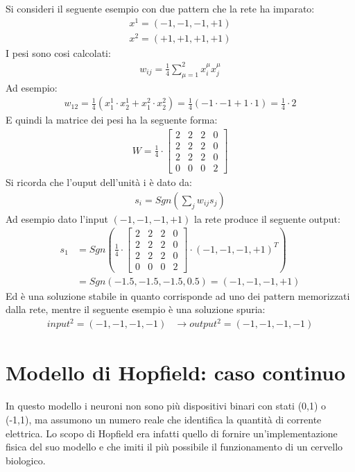 Si consideri il seguente esempio con due pattern che la rete ha imparato:
\begin{align*}
	x^1 = (-1,-1,-1,+1) \\
	x^2 = (+1,+1,+1,+1)
\end{align*}
I pesi sono cosi calcolati:
\begin{align*}
	w_{ij} = \frac{1}{4} \sum_{\mu=1}^2 x_i^\mu x_j^\mu
	\end{align*} 
	Ad esempio:
	\begin{align*}
		w_{12} = \frac{1}{4}(x^1_1 \cdot x^1_2 + x^2_1 \cdot x^2_2) = 
		\frac{1}{4}(-1 \cdot -1 + 1 \cdot 1) = \frac{1}{4} \cdot 2
	\end{align*}
	E quindi la matrice dei pesi ha la seguente forma:
	\begin{align*}
		W = \frac{1}{4} \cdot
		\begin{bmatrix}
			2 & 2 & 2 & 0 \\
			2 & 2 & 2 & 0 \\
			2 & 2 & 2 & 0 \\
			0 & 0 & 0 & 2
		\end{bmatrix}
	\end{align*}
	Si ricorda che l'ouput dell'unità i è dato da:
	\begin{align*}
		s_i = Sgn \left(\sum_j w_{ij} s_j \right)
	\end{align*}
	Ad esempio dato l'input $(-1,-1,-1,+1)$ la rete produce il seguente output:
	\begin{align*}
		s_1 &= Sgn \left( \frac{1}{4} \cdot
		\begin{bmatrix}
			2 & 2 & 2 & 0 \\
			2 & 2 & 2 & 0 \\
			2 & 2 & 2 & 0 \\
			0 & 0 & 0 & 2
			\end{bmatrix} \cdot (-1, -1, -1, +1)^T \right) \\ 
			&= Sgn(-1.5, -1.5, -1.5, 0.5) = (-1,-1,-1,+1)
		\end{align*}
		Ed è una soluzione stabile in quanto corrisponde ad uno dei pattern memorizzati dalla rete, mentre il seguente esempio è una soluzione spuria:
		\begin{align*}
			input^2 = (-1,-1,-1,-1)&\longrightarrow output^2 = (-1,-1,-1,-1) \tag{spuria}
		\end{align*}


		\newpage


		\section{Modello di Hopfield: caso continuo} %
		\label{sec:modello_di_hopfield_caso_continuo}
		In questo modello i neuroni non sono più dispositivi binari con stati (0,1) o (-1,1), ma assumono un numero reale che identifica la quantità di corrente elettrica. Lo scopo di Hopfield era infatti quello di fornire un'implementazione fisica del suo modello e che imiti il più possibile il funzionamento di un cervello biologico.\\

